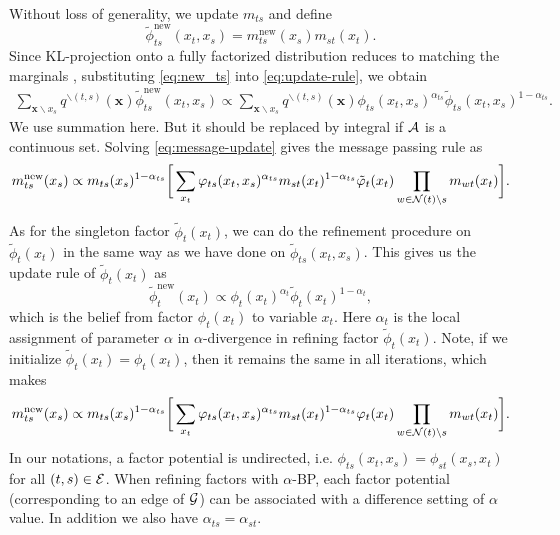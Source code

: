 Without loss of generality, we update $m_{ts}$ and define
\begin{equation}\label{eq:new_ts}
  \tilde{\phi}_{ts}^{\mathrm{new}}(x_t, x_s) = m_{ts}^{\mathrm{new}}(x_s) m_{st}(x_t).
\end{equation}
Since KL-projection onto a fully factorized distribution reduces to matching the marginals \cite[Proposition~8.3]{koller2009pgm}, substituting \eqref{eq:new_ts} into \eqref{eq:update-rule}, we obtain
\begin{align}\label{eq:message-update}
  \sum_{\bm{x}\backslash x_s} q^{\backslash (t,s)}(\bm{x}) \tilde{\phi}_{ts}^{\mathrm{new}}(x_t, x_s) 
  \propto \sum_{\bm{x}\backslash x_s} q^{\backslash (t,s)}(\bm{x}) \phi_{ts}(x_t, x_s)^{\alpha_{ts}} \tilde{\phi}_{ts}(x_t, x_s)^{1-\alpha_{ts}}.
\end{align}
We use summation here. But it should be replaced by integral if $\mathcal{A}$ is a continuous set.
Solving \eqref{eq:message-update} gives the message passing rule as
\begin{align}\label{eq:message-rule-pairwise}
  {m}^{\text{new}}_{ts}(x_s) \propto  m_{ts}(x_s)^{1-\alpha_{ts}} \bigg[\sum_{x_t} \varphi_{ts}(x_t, x_s)^{\alpha_{ts}} {m}_{st}(x_t)^{1-\alpha_{ts}}\tilde{\varphi}_t(x_t) \prod_{w\in \mathcal{N}(t)\backslash s}m_{wt}(x_t) \bigg].
\end{align}

As for the singleton factor $\tilde{\phi}_t(x_t)$, we can do the refinement procedure on $\tilde{\phi}_t(x_t)$ in the same way as we have done on $\tilde{\phi}_{ts}(x_t, x_s)$. This gives us the update rule of $\tilde{\phi}_t(x_t)$ as
\begin{equation}\label{eq:fix-factor-update}
  \tilde{\phi}_t^{\mathrm{new}}(x_t) \propto \phi_t(x_t)^{\alpha_{t}} \tilde{\phi}_t(x_t)^{1-\alpha_{t}},
\end{equation}
which is the belief from factor $\phi_t(x_t)$ to variable $x_t$. Here $\alpha_t$ is the local assignment of parameter $\alpha$ in $\alpha$-divergence in refining factor $\tilde{\phi}_t(x_t)$. Note, if
we initialize $\tilde{\phi}_t(x_t) = \phi_t(x_t)$, then it remains the
same in all iterations, which makes
\begin{align}\label{eq:message-rule}
  {m}^{\mathrm{new}}_{ts}(x_s) \propto
  m_{ts}(x_s)^{1-\alpha_{ts}} \bigg[\sum_{x_t} \varphi_{ts}(x_t, x_s)^{\alpha_{ts}} {m}_{st}(x_t)^{1-\alpha_{ts}} {\varphi}_t(x_t) \prod_{w\in \mathcal{N}(t)\backslash s}m_{wt}(x_t) \bigg].
\end{align}
In our notations, a factor potential is undirected, i.e. $\phi_{ts}(x_t, x_s)=\phi_{st}(x_s, x_t)$ for all $(t,s) \in \mathcal{E}$. When refining factors with $\alpha$-BP, each factor potential (corresponding to an edge of $\mathcal{G}$) can be associated with a difference setting of $\alpha$ value. In addition we also have $\alpha_{ts} = \alpha_{st}$.

